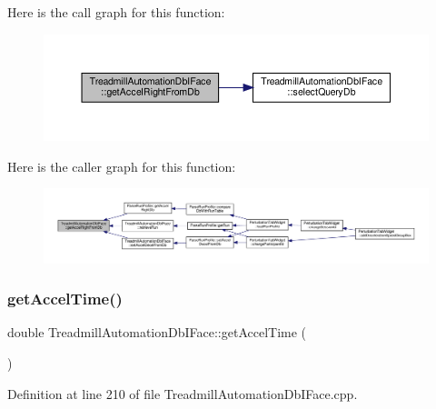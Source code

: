 Here is the call graph for this function\+:
\nopagebreak
\begin{figure}[H]
\begin{center}
\leavevmode
\includegraphics[width=350pt]{class_treadmill_automation_db_i_face_a43f08ef404ec4688139bdcf2980df2d9_cgraph}
\end{center}
\end{figure}
Here is the caller graph for this function\+:
\nopagebreak
\begin{figure}[H]
\begin{center}
\leavevmode
\includegraphics[width=350pt]{class_treadmill_automation_db_i_face_a43f08ef404ec4688139bdcf2980df2d9_icgraph}
\end{center}
\end{figure}
\mbox{\label{class_treadmill_automation_db_i_face_a69909558cb3eb14730a8bee5b1fe4a9f}} 
\subsubsection{\texorpdfstring{get\+Accel\+Time()}{getAccelTime()}}
{\footnotesize\ttfamily double Treadmill\+Automation\+Db\+I\+Face\+::get\+Accel\+Time (\begin{DoxyParamCaption}{ }\end{DoxyParamCaption})}



Definition at line 210 of file Treadmill\+Automation\+Db\+I\+Face.\+cpp.

